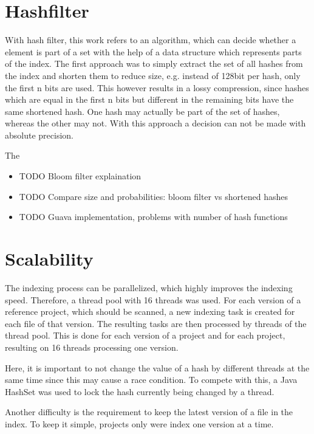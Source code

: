 \section{Hashfilter}\label{section:implementation/hashfilter}
With hash filter, this work refers to an algorithm, which can decide whether a element is part of a set with the help of a data structure which represents parts of the index.
The first approach was to simply extract the set of all hashes from the index and shorten them to reduce size, e.g. instead of 128bit per hash, only the first n bits are used.
This however results in a lossy compression, since hashes which are equal in the first n bits but different in the remaining bits have the same shortened hash.
One hash may actually be part of the set of hashes, whereas the other may not.
With this approach a decision can not be made with absolute precision.

The 

\begin{itemize}
	\item TODO Bloom filter explaination
	\item TODO Compare size and probabilities: bloom filter vs shortened hashes
	\item TODO Guava implementation, problems with number of hash functions
\end{itemize}

\section{Scalability}\label{section:implementation/scalability}
The indexing process can be parallelized, which highly improves the indexing speed.
Therefore, a thread pool with 16 threads was used.
For each version of a reference project, which should be scanned, a new indexing task is created for each file of that version.
The resulting tasks are then processed by threads of the thread pool.
This is done for each version of a project and for each project, resulting on 16 threads processing one version.

Here, it is important to not change the value of a hash by different threads at the same time since this may cause a race condition.
To compete with this, a Java HashSet was used to lock the hash currently being changed by a thread.

Another difficulty is the requirement to keep the latest version of a file in the index.
To keep it simple, projects only were index one version at a time.

